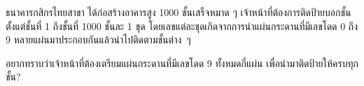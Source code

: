 \question{}

ธนาคารกสิกรไทยสาขา {\techjam} ได้ก่อสร้างอาคารสูง 1000 ชั้นเสร็จหมาด ๆ\; 
เจ้าหน้าที่ต้องการติดป้ายบอกชั้นตั้งแต่ชั้นที่ 1 ถึงชั้นที่ 1000 ชั้นละ 1 ชุด
โดยเลขแต่ละชุดเกิดจากการนำแผ่นกระดานที่มีเลขโดด 0 ถึง 9 
หลายแผ่นมาประกอบกันแล้วนำไปติดตามชั้นต่าง~ๆ\hrsp%

อยากทราบว่าเจ้าหน้าที่ต้องเตรียมแผ่นกระดานที่มีเลขโดด 9 ทั้งหมดกี่แผ่น
เพื่อนำมาติดป้ายให้ครบทุกชั้น?
